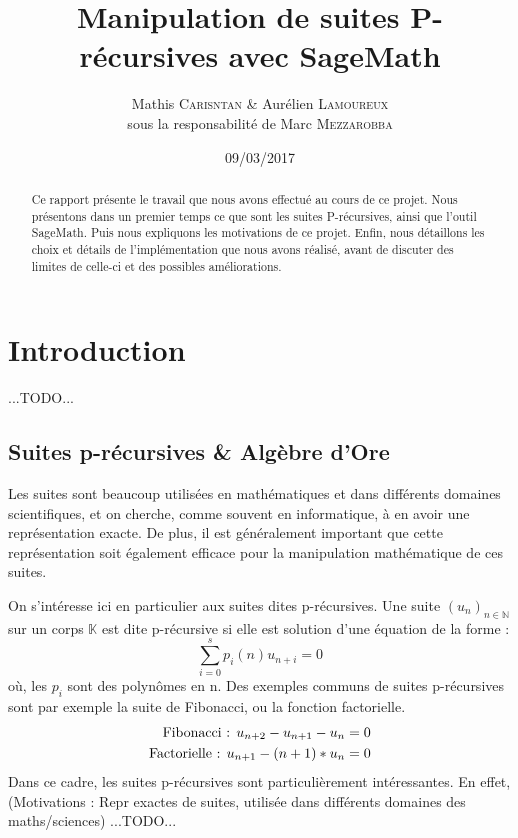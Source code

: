 \documentclass[final,12pt]{article}
\begin{document}
%
\title{Manipulation de suites P-récursives avec SageMath}
\author{Mathis \textsc{Carisntan} \& Aurélien \textsc{Lamoureux} \\ {\small sous la responsabilité de Marc \textsc{Mezzarobba}}}
%
\date{09/03/2017}

\maketitle
%
\begin{abstract}
    Ce rapport présente le travail que nous avons effectué au cours de ce projet.
    Nous présentons dans un premier temps ce que sont les suites P-récursives,
    ainsi que l'outil SageMath. Puis nous expliquons les motivations de ce projet.
    Enfin, nous détaillons les choix et détails de l'implémentation que nous avons réalisé,
    avant de discuter des limites de celle-ci et des possibles améliorations.
\end{abstract}

\section{Introduction}
    \label{sec:intro}
    {\color{red} ...TODO...}
    \subsection{Suites p-récursives \& Algèbre d'Ore}
        \par Les suites sont beaucoup utilisées en mathématiques et dans différents domaines
        scientifiques, et on cherche, comme souvent en informatique, à en avoir une
        représentation exacte. De plus, il est généralement important que cette représentation
        soit également efficace pour la manipulation mathématique de ces suites.
        \par On s'intéresse ici en particulier aux suites dites p-récursives.
        Une suite $(u_n)_{n\in\mathbb N}$ sur un corps $\mathbb K$ est dite p-récursive
        si elle est solution d'une équation de la forme :
        \begin{equation}
            \sum_{i=0}^s p_i(n) u_{n+i} = 0
        \end{equation}
        où, les $p_i$ sont des polynômes en n. Des exemples communs de suites p-récursives
        sont par exemple la suite de Fibonacci, ou la fonction factorielle.
        \begin{eqnarray*}
            \textnormal{Fibonacci : } u_{n+2} - u_{n+1} - u_n = 0\\
            \textnormal{Factorielle : } u_{n+1} - (n+1)*u_n = 0
        \end{eqnarray*}
        Dans ce cadre, les suites p-récursives sont particulièrement intéressantes.
        En effet, 
        (Motivations : Repr exactes de suites, utilisée dans différents domaines des maths/sciences)
        \label{ssec:prec}
        {\color{red} ...TODO...}
\end{document}
